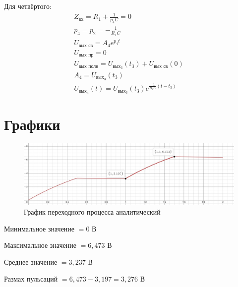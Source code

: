\documentclass{labreport}
\begin{document}
Для четвёртого:
\begin{gather}
    Z_\text{вх} = R_1 + \frac{1}{p_4C} = 0 \\
    p_4 = p_2 = - \frac{1}{R_1C} \\
    U_\textit{вых св} = A_4e^{p_4t} \\ 
    U_\textit{вых пр} = 0 \\ 
    U_\textit{вых полн} =  U_{\textit{вых}_3}(t_3)+ U_\textit{вых св}(0) \\ 
    A_4 = U_{\textit{вых}_3} (t_3) \\
    U_{\textit{вых}_4}(t) = U_{\textit{вых}_3}(t_3)e^{\frac{-1}{R_1C}(t-t_3)}
\end{gather}

\section{Графики}

\begin{samepage}
\begin{figure}[h]
    \centering
    \includegraphics[width=\linewidth]{graph_x_a.jpg}
    \caption{График переходного процесса аналитический}
\end{figure}

Минимальное значение $= 0$ В

Максимальное значение $= 6,473$ В

Среднее значение $= 3,237$ В

Размах пульсаций $= 6,473 - 3,197 = 3,276$ В

\end{samepage}
\end{document}
